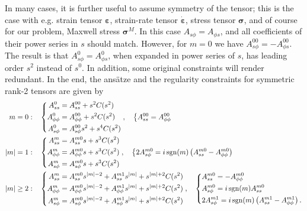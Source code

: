 In many cases, it is further useful to assume symmetry of the tensor; this is the case with e.g. strain tensor $\bm{\varepsilon}$, strain-rate tensor $\dot{\bm{\varepsilon}}$, stress tensor $\bm{\sigma}$, and of course for our problem, Maxwell stress $\bm{\sigma}^M$. In this case $A_{s\phi} = A_{\phi s}$, and all coefficients of their power series in $s$ should match. However, for $m=0$ we have $A_{s\phi}^{00} = -A_{\phi s}^{00}$. The result is that $A_{s\phi}^0 = A_{\phi s}^0$, when expanded in power series of $s$, has leading order $s^2$ instead of $s^0$. In addition, some original constraints will render redundant. In the end, the ansätze and the regularity constraints for symmetric rank-2 tensors are given by
\begin{equation}
    \begin{aligned}
        m = 0 :& \quad \left\{\begin{aligned}
            A_{ss}^0 &= A_{ss}^{00} + s^2 C(s^2) \\ 
            A_{\phi\phi}^0 &= A_{\phi\phi}^{00} + s^2 C(s^2) \\ 
            A_{s\phi}^0 &= A_{s\phi}^{00} s^2 + s^4 C(s^2) 
        \end{aligned}\right.,\quad 
        \left\{\begin{aligned}
            A_{ss}^{00} = A_{\phi\phi}^{00}
        \end{aligned}\right. \\ 
        |m| = 1 :& \quad \left\{\begin{aligned}
            A_{ss}^m &= A_{ss}^{m0} s + s^3 C(s^2) \\
            A_{\phi\phi}^m &= A_{\phi\phi}^{m0} s + s^{3} C(s^2) \\
            A_{s\phi}^m &= A_{s\phi}^{m0} s + s^{3} C(s^2) 
        \end{aligned}\right.,\quad \left\{\begin{aligned}
            & 2A_{s\phi}^{m0} = i\operatorname{sgn}(m) \left(A_{ss}^{m0} - A_{\phi\phi}^{m0}\right)
        \end{aligned}\right. \\
        |m| \geq 2 :& \quad \left\{\begin{aligned}
            A_{ss}^m &= A_{ss}^{m0} s^{|m|-2} + A_{ss}^{m1} s^{|m|} + s^{|m|+2} C(s^2) \\
            A_{\phi\phi}^m &= A_{\phi\phi}^{m0} s^{|m|-2} + A_{\phi \phi}^{m1} s^{|m|} + s^{|m|+2} C(s^2) \\
            A_{s\phi}^m &= A_{s\phi}^{m0} s^{|m|-2} + A_{s\phi}^{m1} s^{|m|} + s^{|m|+2} C(s^2)
        \end{aligned}\right.,\quad \left\{\begin{aligned}
            &A_{ss}^{m0} = - A_{\phi\phi}^{m0}\\
            &A_{s\phi}^{m0} = i \operatorname{sgn}(m) A_{ss}^{m0} \\ 
            &2 A_{s\phi}^{m1} = i\operatorname{sgn}(m)\left(A_{ss}^{m1} - A_{\phi\phi}^{m1}\right).
        \end{aligned}\right.
    \end{aligned}
\end{equation}
